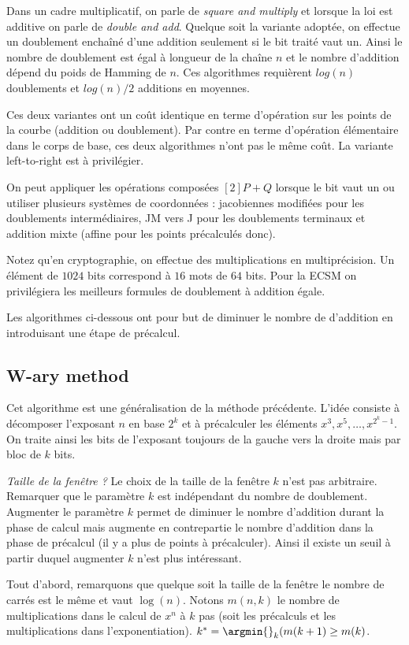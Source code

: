 Dans un cadre multiplicatif, on parle de \emph{square and multiply} et lorsque la loi est additive on parle de \emph{double and add}. Quelque soit la variante adoptée, on effectue un doublement enchaîné d'une addition seulement si le bit traité vaut un. Ainsi le nombre de doublement est égal à longueur de la chaîne $n$ et le nombre d'addition dépend du poids de Hamming de $n$. Ces algorithmes requièrent $log(n)$ doublements et $log(n)/2$ additions en moyennes. 

Ces deux variantes ont un coût identique en terme d'opération sur les points de la courbe (addition ou doublement). Par contre en terme d'opération élémentaire dans le corps de base, ces deux algorithmes n'ont pas le même coût. La variante left-to-right est à privilégier.

On peut appliquer les opérations composées $[2]P + Q$ lorsque le bit vaut un ou utiliser plusieurs systèmes de coordonnées : jacobiennes modifiées pour les doublements intermédiaires, JM vers J pour les doublements terminaux et addition mixte (affine pour les points précalculés donc).

Notez qu'en cryptographie, on effectue des multiplications en multiprécision. Un élément de $1024$ bits correspond à $16$ mots de $64$ bits. Pour la ECSM on privilégiera les meilleurs formules de doublement à addition égale.

Les algorithmes ci-dessous ont pour but de diminuer le nombre de d'addition en introduisant une étape de précalcul.


\subsection{W-ary method}
Cet algorithme est une généralisation de la méthode précédente. L'idée consiste à décomposer l'exposant $n$ en base $2^k$ et à précalculer les éléments $x^3, x^5, \ldots, x^{2^k - 1}$. On traite ainsi les bits de l'exposant toujours de la gauche vers la droite mais par bloc de $k$ bits. 

\emph{Taille de la fenêtre ?} Le choix de la taille de la fenêtre $k$ n'est pas arbitraire. Remarquer que le paramètre $k$ est indépendant du nombre de doublement. Augmenter le paramètre $k$ permet de diminuer le nombre d'addition durant la phase de calcul mais augmente en contrepartie le nombre d'addition dans la phase de précalcul (il y a plus de points à précalculer). Ainsi il existe un seuil à partir duquel augmenter $k$ n'est plus intéressant.

Tout d'abord, remarquons que quelque soit la taille de la fenêtre le nombre de carrés est le même et vaut $\log(n)$. Notons $m(n, k)$ le nombre de multiplications dans le calcul de $x^n$ à $k$ pas (soit les précalculs et les multiplications dans l'exponentiation). $k^* = \argmin{}_k (m(k+1) \geq m(k)$.

